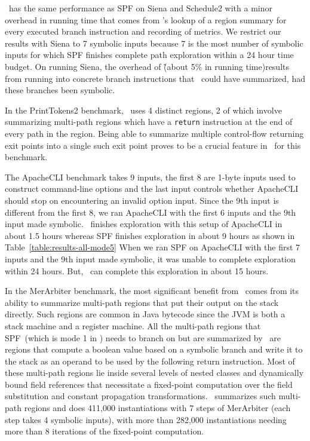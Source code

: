\tool\ has the same performance as SPF on Siena and Schedule2 with a minor overhead in running time that comes from
\tool\rq s lookup of a region summary for every executed branch instruction and recording of metrics.
%
We restrict our results with Siena to 7 symbolic inputs because 7 is the most number of symbolic inputs for which
SPF finishes complete path exploration within a 24 hour time budget.
%
On running Siena, the overhead of \tool\~(about 5\% in running time)results from running into concrete branch
instructions that \tool\ could have summarized, had these branches been symbolic.

In the PrintTokens2 benchmark, \tool\ uses 4 distinct regions, 2 of which involve summarizing multi-path regions which
have a {\tt return} instruction at the end of every path in the region.
%
Being able to summarize multiple control-flow returning exit points into a single such exit point proves to be a crucial
feature in \tool\ for this benchmark.

The ApacheCLI benchmark takes 9 inputs, the first 8 are 1-byte inputs used to construct command-line options and
the last input controls whether ApacheCLI should stop on encountering an invalid option input.
%
Since the 9th input is different from the first 8, we ran ApacheCLI with the first 6 inputs and the 9th input
made symbolic.
%
\tool\ finishes exploration with this setup of ApacheCLI in about 1.5 hours whereas SPF finishes exploration in about 9
hours as shown in Table~\ref{table:results-all-mode5}
%
When we ran SPF on ApacheCLI with the first 7 inputs and the 9th input made symbolic, it was unable to complete
exploration within 24 hours.
%
But, \tool\ can complete this exploration in about 15 hours.

In the MerArbiter benchmark, the most significant benefit from \tool\ comes from its ability to summarize multi-path
regions that put their output on the stack directly.
%
Such regions are common in Java bytecode since the JVM is both a stack machine and a register machine.
%
All the multi-path regions that SPF~(which is mode 1 in \tool) needs to branch on but are summarized by \tool\ are
regions that compute a boolean value based on a symbolic branch and write it to the stack as an operand to be used
by the following return instruction.
%
Most of these multi-path regions lie inside several levels of nested classes and dynamically bound field references
that necessitate a fixed-point computation over the field substitution and constant propagation transformations.
%
\tool\ summarizes such multi-path regions and does 411,000 instantiations with 7 steps of MerArbiter (each step takes 4
symbolic inputs), with more than 282,000 instantiations needing more than 8 iterations of the fixed-point computation.

